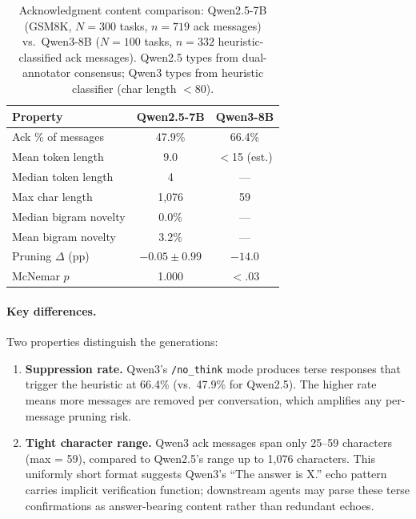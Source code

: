 \begin{table}[ht]
\centering
\caption{Acknowledgment content comparison: Qwen2.5-7B (GSM8K, $N = 300$ tasks, $n = 719$ ack messages) vs.\ Qwen3-8B ($N = 100$ tasks, $n = 332$ heuristic-classified ack messages). Qwen2.5 types from dual-annotator consensus; Qwen3 types from heuristic classifier (char length $< 80$).}
\label{tab:qwen3_vs_qwen25}
\small
\begin{tabular}{lcc}
\toprule
\textbf{Property} & \textbf{Qwen2.5-7B} & \textbf{Qwen3-8B} \\
\midrule
Ack \% of messages & 47.9\% & 66.4\% \\
Mean token length & 9.0 & $<$15 (est.) \\
Median token length & 4 & --- \\
Max char length & 1{,}076 & 59 \\
Median bigram novelty & 0.0\% & --- \\
Mean bigram novelty & 3.2\% & --- \\
Pruning $\Delta$ (pp) & $-0.05 \pm 0.99$ & $-14.0$ \\
McNemar $p$ & 1.000 & $<.03$ \\
\bottomrule
\end{tabular}
\end{table}

\paragraph{Key differences.} Two properties distinguish the generations:
\begin{enumerate}[nosep, leftmargin=*]
    \item \textbf{Suppression rate.} Qwen3's \texttt{/no\_think} mode produces terse responses that trigger the heuristic at 66.4\% (vs.\ 47.9\% for Qwen2.5). The higher rate means more messages are removed per conversation, which amplifies any per-message pruning risk.
    \item \textbf{Tight character range.} Qwen3 ack messages span only 25--59 characters (max = 59), compared to Qwen2.5's range up to 1{,}076 characters. This uniformly short format suggests Qwen3's ``The answer is X.'' echo pattern carries implicit verification function; downstream agents may parse these terse confirmations as answer-bearing content rather than redundant echoes.
\end{enumerate}

